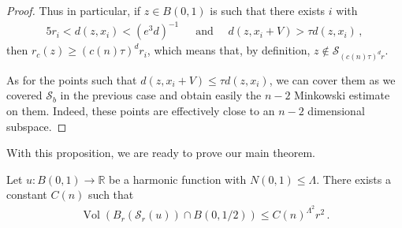 \documentclass[11pt]{article}
\begin{document}
\begin{proof}
Thus in particular, if $z\in B(0,1)$ is such that there exists $i$ with
\begin{gather}
 5r_i<d(z,x_i)< (e^3d)^{-1}\, \quad \text{ and } \quad d(z,x_i+V) > \tau d(z,x_i)\, ,
\end{gather}
then $r_c(z)\geq (c(n)\tau)^{d}r_i$, which means that, by definition, $z\not \in {\mathcal{S}}_{(c(n)\tau)^d r}$. 

As for the points such that $d(z,x_i+V) \leq \tau d(z,x_i)$, we can cover them as we covered ${\mathcal{S}}_b$ in the previous case and obtain easily the $n-2$ Minkowski estimate on them. Indeed, these points are effectively close to an $n-2$ dimensional subspace.
\end{proof}

With this proposition, we are ready to prove our main theorem.

\begin{theorem}\label{th_vol_harm}
 Let $u:B(0,1)\to {\mathbb{R}}$ be a harmonic function with $N(0,1)\leq \Lambda$. There exists a constant $C(n)$ such that
 \begin{gather}
  {\operatorname{Vol}}{\left({B_r{\left({{\mathcal{S}}_r(u)}\right)} \cap B(0,1/2)}\right)}\leq C(n)^{\Lambda^2} r^2\, .
 \end{gather}
\end{theorem}
\end{document}
